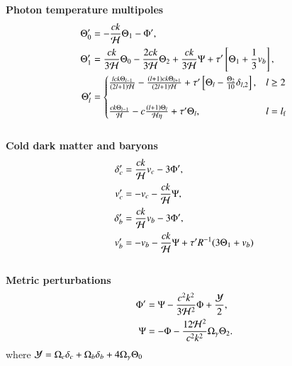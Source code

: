     \begin{tcolorbox}[
        width=1.025\linewidth,
        colback=blue!5!white,
        colframe=white
    ]
    
    \textbf{Photon temperature multipoles}
    \begin{subequations}\label{eq:m3:theory:photon_temp_multipoles}
        \begin{align}
            \Theta_0' &= -\frac{ck}{\mathcal{H}}\Theta_1-\Phi',\label{eq:m3:theory:photon_monopole}\\
            \Theta_1' &= \frac{ck}{3\mathcal{H}}\Theta_0 - \frac{2ck}{3\mathcal{H}}\Theta_2 +\frac{ck}{3\mathcal{H}}\Psi+\tau'\left[\Theta_1+\frac{1}{3}v_b\right],\label{eq:m3:theory:photon_dipole}\\
            \Theta_l' &= \begin{cases}
                \frac{lck\Theta_{l-1}}{(2l+1)\mathcal{H}} -\frac{(l+1)ck\Theta_{l+1}}{(2l+1)\mathcal{H}} +\tau'\left[\Theta_l-\frac{\Theta_2}{10}\delta_{l,2}\right], &l\geq2\\
                \\
                \frac{ck\Theta_{l-1}}{\mathcal{H}} - c\frac{(l+1)\Theta_l}{\mathcal{H}\eta}+\tau'\Theta_l, &l=l_\mathrm{f}
            \end{cases}\label{eq:m3:theory:photon_multipole}
        \end{align}
    \end{subequations}
    \\
    \textbf{Cold dark matter and baryons}
    \begin{subequations}\label{eq:m3:theory:cdm_baryon_diffeqs}
        \begin{align}
            \delta'_c &= \frac{ck}{\mathcal{H}}v_c-3\Phi', \label{eq:m3:theory:delta_cdm}\\
            v'_c &= -v_c-\frac{ck}{\mathcal{H}}\Psi, \label{eq:m3:theory:v_cdm}\\
            \delta'_b &= \frac{ck}{\mathcal{H}}v_b - 3\Phi', \label{eq:m3:theory:delta_b}\\
            v'_b &= -v_b - \frac{ck}{\mathcal{H}}\Psi + \tau'R^{-1}(3\Theta_1+v_b) \label{eq:m3:theory:v_b}
        \end{align}
    \end{subequations}
    \\
    \textbf{Metric perturbations}
    \begin{subequations}\label{eq:m3:theory:metric_perturbations_final}
        \begin{align}
            \Phi' &= \Psi - \frac{c^2k^2}{3\mathcal{H}^2}\Phi + \frac{\mathcal{Y}}{2}, \label{eq:m3:theory:phi_perturbation}\\
            \Psi &= -\Phi - \frac{12\mathcal{H}^2}{c^2k^2}\Omega_\gamma\Theta_2. \label{eq:m3:theory:psi_perturbation}
        \end{align}
    \end{subequations}
    where $\mathcal{Y} = \Omega_c\delta_c+\Omega_b\delta_b+4\Omega_\gamma\Theta_0$ 

\end{tcolorbox}
